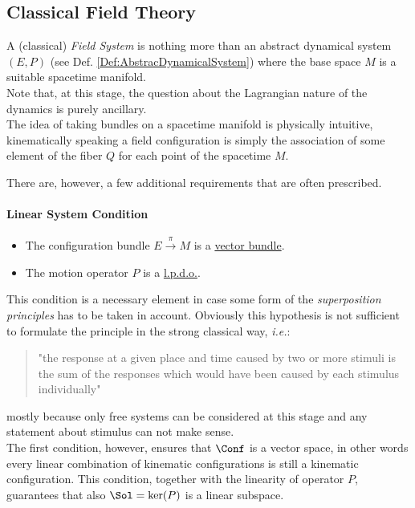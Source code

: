 \documentclass[Main]{subfiles}
\begin{document}
		\subsection{Classical Field Theory}\label{Section:CFT}
		A (classical) \emph{Field System} is nothing more than an abstract dynamical system $(E,P)$ (see Def. \ref{Def:AbstracDynamicalSystem}) where the base space $M$  is a suitable spacetime manifold\cite{Bar}. 
		\\
		Note that, at this stage, the question about the Lagrangian nature of the dynamics is purely ancillary.
		\\		
		The idea of taking bundles on a spacetime manifold is physically intuitive, kinematically speaking a field configuration is simply the association of some element of the fiber $Q $ for each point of the spacetime $M$.
		
		There are, however, a few additional requirements that are often prescribed.
		\paragraph{Linear System Condition}		
			\begin{itemize}
				 \item The configuration bundle $E\xrightarrow{\pi} M$ is a \underline{vector bundle}.
				 \item The motion operator $P$ is a \underline{l.p.d.o.}.
			\end{itemize}
			This condition is a necessary element in case some form of the \emph{superposition principles} has to be taken in account. 
			Obviously this hypothesis is not sufficient to formulate the principle in the strong classical way, \textit{i.e.}:
			\begin{quote}
			"the response at a given place and time caused by two or more stimuli is the sum of the responses which would have been caused by each stimulus individually"
			\end{quote} 
			mostly because only free systems can be considered at this stage and any statement about stimulus can not make sense.
			\\
			The first condition, however, ensures that $\Conf$ is a vector space, in other words every linear combination of kinematic configurations is still a kinematic configuration.
			This condition, together with the linearity of operator $P$,  guarantees that also $\Sol= \ker(P)$ is a linear subspace.		
			 
\end{document}

